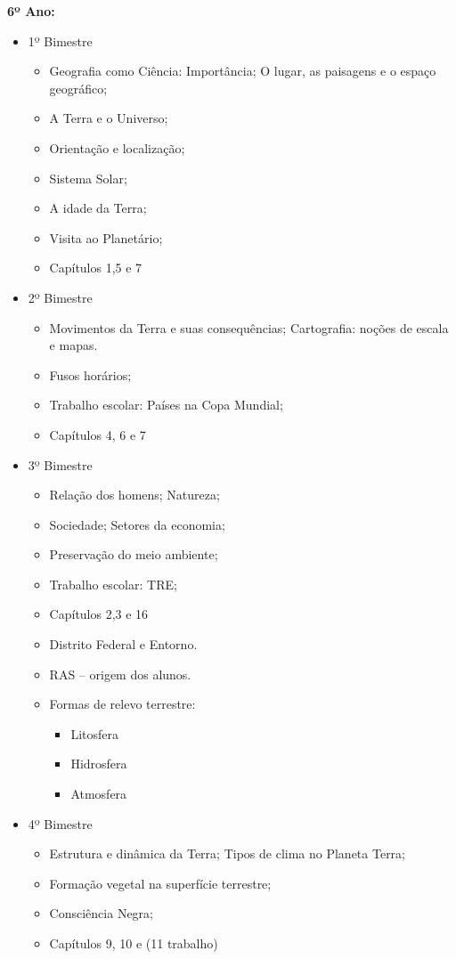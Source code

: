\textbf{6º Ano:}
\begin{itemize}
\item 1º Bimestre
\begin{itemize}
\item Geografia como Ciência: Importância; O lugar, as paisagens e o espaço geográfico;
\item A Terra e o Universo;
\item Orientação e localização;
\item Sistema Solar;
\item A idade da Terra;
\item Visita ao Planetário;
\item Capítulos 1,5 e 7
\end{itemize}
\end{itemize}
\begin{itemize}
\item 2º Bimestre
\begin{itemize}
\item Movimentos da Terra e suas consequências; Cartografia: noções de escala e mapas. 
\item Fusos horários;
\item Trabalho escolar: Países na Copa Mundial;
\item Capítulos 4, 6 e 7
\end{itemize}
\end{itemize}
\begin{itemize}
\item 3º Bimestre
\begin{itemize}
\item Relação dos homens; Natureza; 
\item Sociedade; Setores da economia;
\item Preservação do meio ambiente;
\item Trabalho escolar: TRE;
\item Capítulos 2,3 e 16
\item Distrito Federal e Entorno.
\item RAS – origem dos alunos.
\item Formas de relevo terrestre:
\begin{itemize}
\item Litosfera
\item Hidrosfera
\item Atmosfera
\end{itemize}
\end{itemize}
\end{itemize}
\begin{itemize}
\item 4º Bimestre
\begin{itemize}
\item Estrutura e dinâmica da Terra; Tipos de clima no Planeta Terra;
\item Formação vegetal na superfície terrestre;
\item Consciência Negra;
\item Capítulos 9, 10 e (11 trabalho)
\end{itemize}
\end{itemize}
